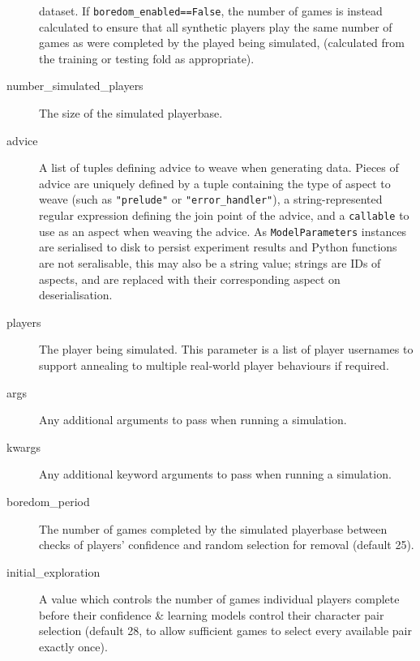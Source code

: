 \begin{description}
  dataset. If \lstinline{boredom_enabled==False}, the number of games is instead
  calculated to ensure that all synthetic players play the same number of games
  as were completed by the played being simulated, (calculated from the training
  or testing fold as appropriate).
  \item[number\_simulated\_players] The size of the simulated playerbase.
  \item[advice] A list of tuples defining advice to weave when generating data.
  Pieces of advice are uniquely defined by a tuple containing the type of aspect
  to weave (such as \lstinline{"prelude"} or \lstinline{"error_handler"}), a
  string-represented regular expression defining the join point of the advice,
  and a \lstinline{callable} to use as an aspect when weaving the advice. As
  \lstinline{ModelParameters} instances are serialised to disk to persist
  experiment results and Python functions are not seralisable, this may also be
  a string value; strings are IDs of aspects, and are replaced with their
  corresponding aspect on deserialisation.
  \item[players] The player being simulated. This parameter is a list of player
  usernames to support annealing to multiple real-world player behaviours if required.
  \item[args] Any additional arguments to pass when running a simulation.
  \item[kwargs] Any additional keyword arguments to pass when running a simulation.
  \item[boredom\_period] The number of games completed by the simulated
  playerbase between checks of players' confidence and random selection for
  removal (default 25).
  \item[initial\_exploration] A value which controls the number of
  games individual players complete before their confidence \& learning models control
  their character pair selection (default 28, to allow sufficient games to
  select every available pair exactly once).
\end{description}

